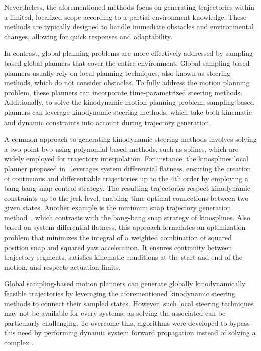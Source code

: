 Nevertheless, the aforementioned methods focus on generating trajectories within a limited, localized scope according to a partial environment knowledge. 
These methods are typically designed to handle immediate obstacles and environmental changes, allowing for quick responses and adaptability.

In contrast, global planning problems are more effectively addressed by sampling-based global planners that cover the entire environment.
Global sampling-based planners usually rely on local planning techniques, also known as steering methods, which do not consider obstacles. 
To fully address the motion planning problem, these planners can incorporate time-parametrized steering methods. 
Additionally, to solve the kinodynamic motion planning problem, sampling-based planners can leverage kinodynamic steering methods, which take both kinematic and dynamic constraints into account during trajectory generation.

A common approach to generating kinodynamic steering methods involves solving a two-point \gls{bvp} using polynomial-based methods, such as splines, which are widely employed for trajectory interpolation. 
For instance, the kinosplines local planner proposed in~\cite{cKino} leverages system differential flatness, ensuring the creation of continuous and differentiable trajectories up to the 4th order by employing a bang-bang snap control strategy. 
The resulting trajectories respect kinodynamic constraints up to the jerk level, enabling time-optimal connections between two given states.
Another example is the minimum snap trajectory generation method~\cite{cMinimumSnap}, which contrasts with the bang-bang snap strategy of kinosplines. 
Also based on system differential flatness, this approach formulates an optimization problem that minimizes the integral of a weighted combination of squared position snap and squared yaw acceleration.
It ensures continuity between trajectory segments, satisfies kinematic conditions at the start and end of the motion, and respects actuation limits.

Global sampling-based motion planners can generate globally kinodynamically feasible trajectories by leveraging the aforementioned kinodynamic steering methods to connect their sampled states.
However, such local steering techniques may not be available for every systems, as solving the associated  can be particularly challenging. 
To overcome this, algorithms were developed to bypass this need by performing dynamic system forward propagation instead of solving a complex .

